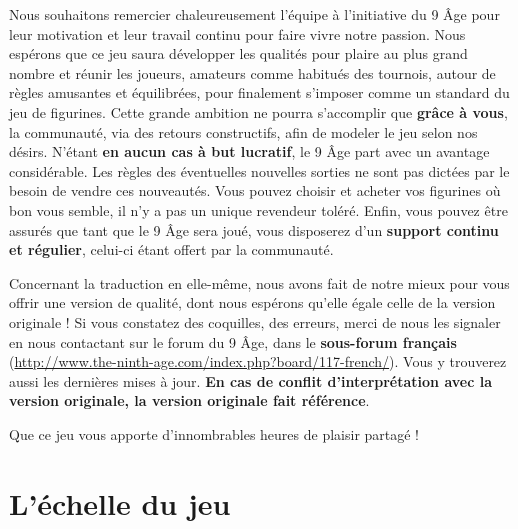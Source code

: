 Nous souhaitons remercier chaleureusement l'équipe à l'initiative du 9\ieme{} Âge pour leur motivation et leur travail continu pour faire vivre notre passion. Nous espérons que ce jeu saura développer les qualités pour plaire au plus grand nombre et réunir les joueurs, amateurs comme habitués des tournois, autour de règles amusantes et équilibrées, pour finalement s'imposer comme un standard du jeu de figurines. Cette grande ambition ne pourra s'accomplir que \textbf{grâce à vous}, la communauté, via des retours constructifs, afin de modeler le jeu selon nos désirs. N'étant \textbf{en aucun cas à but lucratif}, le 9\ieme{} Âge part avec un avantage considérable. Les règles des éventuelles nouvelles sorties ne sont pas dictées par le besoin de vendre ces nouveautés. Vous pouvez choisir et acheter vos figurines où bon vous semble, il n'y a pas un unique revendeur toléré. Enfin, vous pouvez être assurés que tant que le 9\ieme{} Âge sera joué, vous disposerez d'un \textbf{support continu et régulier}, celui-ci étant offert par la communauté.

Concernant la traduction en elle-même, nous avons fait de notre mieux pour vous offrir une version de qualité, dont nous espérons qu'elle égale celle de la version originale ! Si vous constatez des coquilles, des erreurs, merci de nous les signaler en nous contactant sur le forum du 9\ieme{} Âge, dans le \textbf{sous-forum français} (\url{http://www.the-ninth-age.com/index.php?board/117-french/}). Vous y trouverez aussi les dernières mises à jour. \textbf{En cas de conflit d'interprétation avec la version originale, la version originale fait référence}.

Que ce jeu vous apporte d'innombrables heures de plaisir partagé !

\vspace*{0.5cm}

\vfill
\noindent {}


\newpage
\section{L'échelle du jeu}

